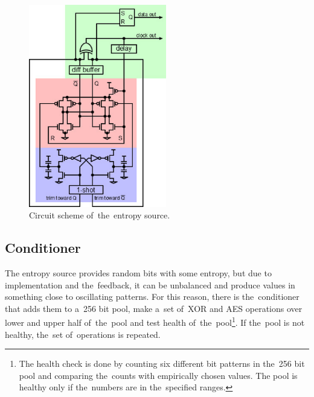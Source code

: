 \begin{figure}[h!]
  \centering
 \includegraphics[width=6cm,keepaspectratio]{fig/entropy-source-circuit} %
\caption{Circuit scheme of~the~entropy source\cite{UnderstandingRdRandElectronic}.}
\label{fig:ES-circuit}
\end{figure}

\subsection{Conditioner}
The entropy source provides random bits with some entropy, but due to implementation and the~feedback, it can be unbalanced and produce values in something close to oscillating patterns. For this reason, there is the~conditioner that adds them to a~256 bit pool, make a~set of~XOR and AES operations over lower and upper half of~the~pool and test health of~the~pool\footnote{The health check is done by counting six different bit patterns in the~256 bit pool and comparing the~counts with empirically chosen values. The pool is healthy only if the~numbers are in the~specified ranges.}\cite{AnalysisOfDRNG}\cite{UnderstandingRdRandElectronic}. If the~pool is not healthy, the~set of~operations is repeated. 

